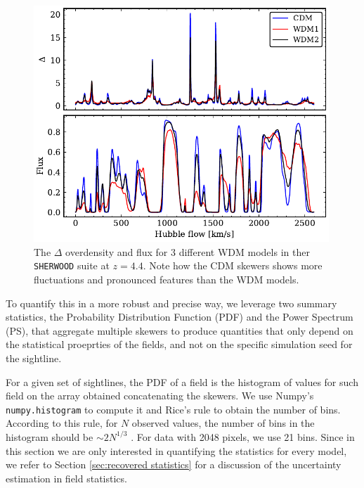 \begin{figure}[h]
        \centering
            \includegraphics[width=0.99\textwidth]{img/ML/skewer_delta_flux.pdf}
            \caption{The $\Delta$ overdensity and flux for 3 different WDM models in ther \texttt{SHERWOOD} suite at $z=4.4$. Note how the CDM skewers shows more fluctuations and pronounced features than the WDM models.}
            \label{fig: skewer delta flux}
\end{figure}
To quantify this in a more robust and precise way, we leverage two summary statistics, the Probability Distribution Function (PDF) and the Power Spectrum (PS), that aggregate multiple skewers to produce quantities that only depend on the statistical proeprties of the fields, and not on the specific simulation seed for the sightline.

For a given set of sightlines, the PDF of a field is the histogram of values for such field on the array obtained concatenating the skewers. We use Numpy's \texttt{numpy.histogram} to compute it and Rice's rule to obtain the number of bins. According to this rule, for $N$ observed values, the number of bins in the histogram should be $\sim 2N^{1/3}$ \cite{Freedman1981}. For data with 2048 pixels, we use 21 bins. Since in this section we are only interested in quantifying the statistics for every model, we refer to Section \ref{sec:recovered statistics} for a discussion of the uncertainty estimation in field statistics.


